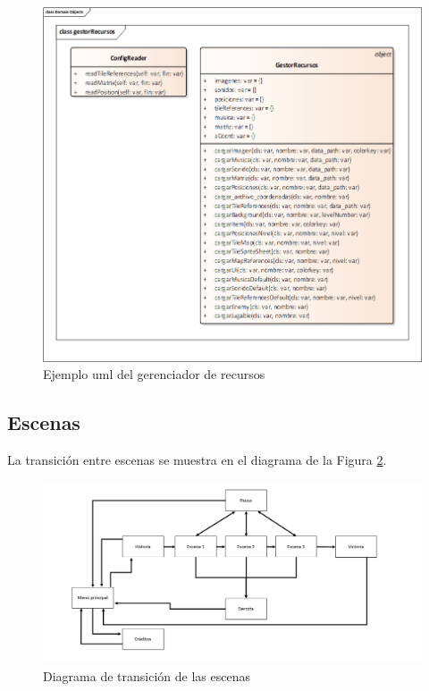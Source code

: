 \begin{figure}[H]
	\centering
	\includegraphics[scale=0.30]{imagenes/GestorRecursos.png}
	\caption{\label{fig:GestorRecursos}Ejemplo uml del gerenciador de recursos}
\end{figure}

\subsection{Escenas}

La transición entre escenas se muestra en el diagrama de la Figura \ref{fig:TrasicionEscenas}. 

\begin{figure}[H]
	\centering
	\includegraphics[scale=0.35]{imagenes/transicionEscenas.jpeg}
	\caption{\label{fig:TrasicionEscenas}Diagrama de transición de las escenas}
\end{figure}

